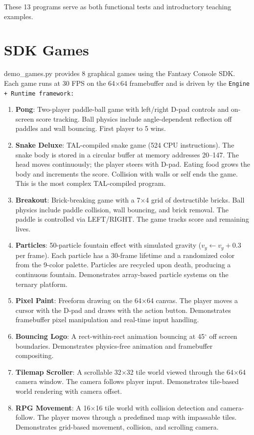 \documentclass[12pt,a4paper,twoside]{book}
\theoremstyle{trinarytheorem}
\theoremstyle{trinarydefinition}
\newcommand{\code}[1]{\textsf{#1}}
\begin{document}
These 13 programs serve as both functional tests and introductory teaching examples.

\section{SDK Games}

\code{demo\_games.py} provides 8 graphical games using the Fantasy Console SDK.
Each game runs at 30 FPS on the 64$\times$64 framebuffer and is driven by the
\tt{Engine} + \tt{Runtime} framework:

\begin{enumerate}
    \item \textbf{Pong}: Two-player paddle-ball game with left/right D-pad controls
          and on-screen score tracking. Ball physics include angle-dependent reflection
          off paddles and wall bouncing. First player to 5 wins.
    \item \textbf{Snake Deluxe}: TAL-compiled snake game (524 CPU instructions). The
          snake body is stored in a circular buffer at memory addresses 20--147.
          The head moves continuously; the player steers with D-pad. Eating food
          grows the body and increments the score. Collision with walls or self
          ends the game. This is the most complex TAL-compiled program.
    \item \textbf{Breakout}: Brick-breaking game with a 7$\times$4 grid of destructible
          bricks. Ball physics include paddle collision, wall bouncing, and brick
          removal. The paddle is controlled via LEFT/RIGHT. The game tracks score
          and remaining lives.
    \item \textbf{Particles}: 50-particle fountain effect with simulated gravity
          ($v_y \gets v_y + 0.3$ per frame). Each particle has a 30-frame lifetime
          and a randomized color from the 9-color palette. Particles are recycled
          upon death, producing a continuous fountain. Demonstrates array-based
          particle systems on the ternary platform.
    \item \textbf{Pixel Paint}: Freeform drawing on the 64$\times$64 canvas. The
          player moves a cursor with the D-pad and draws with the action button.
          Demonstrates framebuffer pixel manipulation and real-time input handling.
    \item \textbf{Bouncing Logo}: A rect-within-rect animation bouncing at 45$^\circ$
          off screen boundaries. Demonstrates physics-free animation and framebuffer
          compositing.
    \item \textbf{Tilemap Scroller}: A scrollable 32$\times$32 tile world viewed
          through the 64$\times$64 camera window. The camera follows player input.
          Demonstrates tile-based world rendering with camera offset.
    \item \textbf{RPG Movement}: A 16$\times$16 tile world with collision detection
          and camera-follow. The player moves through a predefined map with
          impassable tiles. Demonstrates grid-based movement, collision, and
          scrolling camera.
\end{enumerate}
\end{document}
